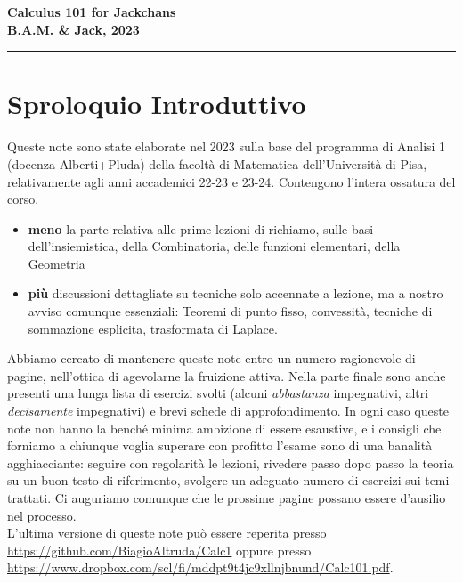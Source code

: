\documentclass[a4paper,twoside]{article}
\renewcommand{\epsilon}{\varepsilon}
\theoremstyle{definition}
\numberwithin{theorem}{section}
\begin{document}
\setlength\parindent{0pt}
\thispagestyle{empty}
\begin{center}{\large \textbf{ {\Huge Calculus 101 for Jackchans} \\
B.A.M. \& Jack, 2023}}
\end{center}
\rule{\textwidth}{1pt}
\tableofcontents

\section{Sproloquio Introduttivo}
Queste note sono state elaborate nel 2023 sulla base del programma di Analisi 1 (docenza Alberti+Pluda) della facoltà di Matematica dell'Università di Pisa, relativamente agli anni accademici 22-23 e 23-24. Contengono l'intera ossatura del corso,
\begin{itemize}
 \item \textbf{meno} la parte relativa alle prime lezioni di richiamo, sulle basi dell'insiemistica, della Combinatoria, delle funzioni elementari, della Geometria
 \item \textbf{più} discussioni dettagliate su tecniche solo accennate a lezione, ma a nostro avviso comunque essenziali: Teoremi di punto fisso, convessità, tecniche di sommazione esplicita, trasformata di Laplace.
\end{itemize}
Abbiamo cercato di mantenere queste note entro un numero ragionevole di pagine, nell'ottica di agevolarne la fruizione attiva. Nella parte finale sono anche presenti una lunga lista di esercizi svolti (alcuni \emph{abbastanza} impegnativi, altri \emph{decisamente} impegnativi) e brevi schede di approfondimento. In ogni caso queste note non hanno la benché minima ambizione di essere esaustive, e i consigli che forniamo a chiunque voglia superare con profitto l'esame sono di una banalità agghiacciante: seguire con regolarità le lezioni, rivedere passo dopo passo la teoria su un buon testo di riferimento, svolgere un adeguato numero di esercizi sui temi trattati. Ci auguriamo comunque che le prossime pagine possano essere d'ausilio nel processo.\\

L'ultima versione di queste note può essere reperita presso \url{https://github.com/BiagioAltruda/Calc1} oppure presso \url{https://www.dropbox.com/scl/fi/mddpt9t4jc9xllnjbnund/Calc101.pdf}.





\end{document}
